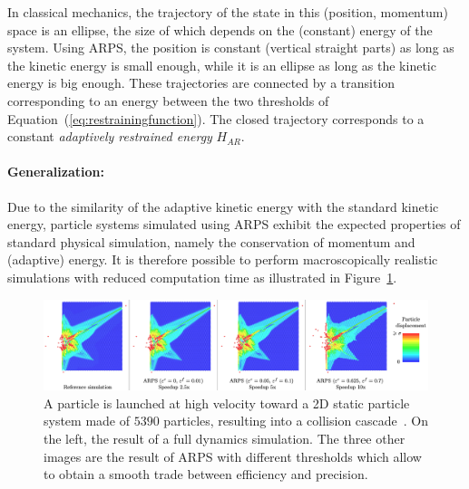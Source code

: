In classical mechanics, the trajectory of the state in this (position, momentum) space is an ellipse, the size of which depends on the (constant) energy of the system.
Using ARPS, the position is constant (vertical straight parts) as long as the kinetic energy is small enough, while it is an ellipse as long as the kinetic energy is big enough.
These trajectories are connected by a transition corresponding to an energy between the two thresholds of Equation~(\ref{eq:restrainingfunction}).
The closed trajectory corresponds to a constant \textit{adaptively restrained energy} $H_{AR}$.

\paragraph*{Generalization:}
Due to the similarity of the adaptive kinetic energy with the standard kinetic energy, particle systems simulated using ARPS exhibit the expected properties of standard physical simulation, namely the conservation of momentum and (adaptive) energy. It is therefore possible to perform macroscopically realistic simulations with reduced computation time as illustrated in Figure~\ref{fig:cascadeCollision}.

\begin{figure}[h!]
	\centering
	\includegraphics[width=1.0\linewidth]{images/arps-vriphys2013/ARPS_Collision_Artemova.png}
	\caption[ARPS: Collision Cascade from~\cite{Artemova2012}]{\label{fig:cascadeCollision} 
		A particle is launched at high velocity toward a 2D static particle system made of $5390$ particles, resulting into a collision cascade~\cite{Artemova2012}. 
		On the left, the result of a full dynamics simulation. 
		The three other images are the result of ARPS with different thresholds which allow to obtain a smooth trade between efficiency and precision.}
\end{figure}

